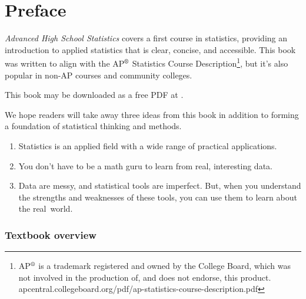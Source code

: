\chapter*{{\color{oiB}Preface}\vspace{-6mm}}

\noindent%
\emph{Advanced High School Statistics} covers a first course in statistics, providing an introduction to applied statistics that is clear, concise, and accessible. This book was written to align with the AP$^{\text{\textregistered}}$ Statistics Course
Description\footnote{AP$^{\text{\textregistered}}$ is
  a trademark registered and owned by the College Board,
  which was not involved in the production of, and does
  not endorse, this product.
      {apcentral.collegeboard.org/pdf/ap-statistics-course-description.pdf}}, but it's also popular in non-AP courses and community colleges.
\vspace{3mm}

\noindent%
This book may be downloaded as a free PDF at
.
\vspace{3mm}

\noindent%
We hope readers will take away three ideas from this book in addition to forming a foundation of statistical thinking and methods.\vspace{-1mm}
\begin{enumerate}
\setlength{\itemsep}{0mm}
\item[(1)] Statistics is an applied field with a wide range of practical applications.
\item[(2)] You don't have to be a math guru to learn from real, interesting data.
\item[(3)] Data are messy, and statistical tools are imperfect. But, when you understand the strengths and weaknesses of these tools, you can use them to learn about the real~world.
\end{enumerate}


\subsection*{{\color{oiB}Textbook overview}}

